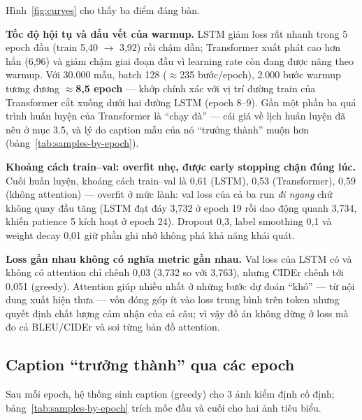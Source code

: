Hình~\ref{fig:curves} cho thấy ba điểm đáng bàn.

\textbf{Tốc độ hội tụ và dấu vết của warmup.} LSTM giảm loss rất nhanh trong
5 epoch đầu (train 5,40 $\to$ 3,92) rồi chậm dần; Transformer xuất phát cao hơn
hẳn (6,96) và giảm chậm giai đoạn đầu vì learning rate còn đang được nâng theo
warmup. Với 30.000 mẫu, batch 128 ($\approx$235 bước/epoch), 2.000 bước warmup
tương đương $\approx$\textbf{8,5 epoch} --- khớp chính xác với vị trí đường
train của Transformer cắt xuống dưới hai đường LSTM (epoch 8--9). Gần một phần
ba quá trình huấn luyện của Transformer là ``chạy đà'' --- cái giá về lịch huấn
luyện đã nêu ở mục 3.5, và lý do caption mẫu của nó ``trưởng thành'' muộn hơn
(bảng~\ref{tab:samples-by-epoch}).

\textbf{Khoảng cách train--val: overfit nhẹ, được early stopping chặn đúng lúc.}
Cuối huấn luyện, khoảng cách train--val là 0,61 (LSTM), 0,53 (Transformer), 0,59
(không attention) --- overfit ở mức lành: val loss của cả ba run \emph{đi
ngang} chứ không quay đầu tăng (LSTM đạt đáy 3,732 ở epoch 19 rồi dao động
quanh 3,734, khiến patience 5 kích hoạt ở epoch 24). Dropout 0,3, label
smoothing 0,1 và weight decay 0,01 giữ phần ghi nhớ không phá khả năng khái quát.

\textbf{Loss gần nhau không có nghĩa metric gần nhau.} Val loss của LSTM có và
không có attention chỉ chênh 0,03 (3,732 so với 3,763), nhưng CIDEr chênh tới
0,051 (greedy). Attention giúp nhiều nhất ở những bước dự đoán ``khó'' --- từ
nội dung xuất hiện thưa --- vốn đóng góp ít vào loss trung bình trên token
nhưng quyết định chất lượng cảm nhận của cả câu; vì vậy đồ án không dừng ở
loss mà đo cả BLEU/CIDEr và soi từng bản đồ attention.

\subsection{Caption ``trưởng thành'' qua các epoch}

Sau mỗi epoch, hệ thống sinh caption (greedy) cho 3 ảnh kiểm định cố định;
bảng~\ref{tab:samples-by-epoch} trích mốc đầu và cuối cho hai ảnh tiêu biểu.

